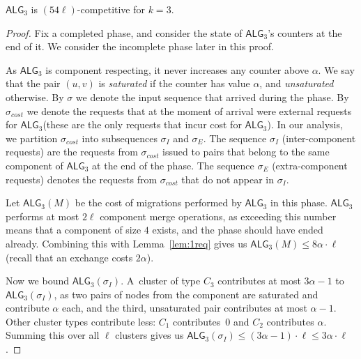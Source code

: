 \documentclass[a4paper,anonymous,USenglish]{lipics-v2019}
\newcommand{\TAlg}{{\ensuremath{\textsf{ALG}_{3}}}\xspace}
\begin{document}
\begin{theorem}
	\TAlg is $(54\ell)$-competitive for $k=3$.
\end{theorem}
\begin{proof}
	Fix a completed phase, and consider the state of \TAlg's counters at the end of it.
	We consider the incomplete phase later in this proof.
	
	As \TAlg is component respecting, it never increases any counter above $\alpha$.
	We say that the pair $(u, v)$ is \emph{saturated} if the counter has value $\alpha$, and \emph{unsaturated} otherwise.
	By $\sigma$ we denote the input sequence that arrived during the phase.
	By $\sigma_{cost}$ we denote the requests that at the moment of arrival were external requests for \TAlg (these are the only requests that incur cost for \TAlg).
	In our analysis, we partition $\sigma_{cost}$ into subsequences $\sigma_I$ and $\sigma_E$.
	The sequence $\sigma_I$ (inter-component requests) are the requests from $\sigma_{cost}$ issued to pairs that belong to the same component of \TAlg at the end of the phase.
	The sequence $\sigma_E$ (extra-component requests) denotes the requests from $\sigma_{cost}$ that do not appear in $\sigma_I$.
	
	
	Let $\TAlg(M)$ be the cost of migrations performed by \TAlg in this phase.
	\TAlg performs at most $2 \ell$ component merge operations, as
	exceeding this number means that a component of size $4$ exists, and the phase should have ended already.
	Combining this with Lemma~\ref{lem:1req} gives us $\TAlg(M) \leq 8\alpha\cdot\ell$ (recall that an exchange costs $2\alpha$).
	
	Now we bound $\TAlg(\sigma_I)$.
	A~cluster of type $C_3$ contributes at most $3 \alpha - 1$ to $\TAlg(\sigma_I)$, as two pairs of nodes from the component are saturated and contribute $\alpha$ each, and the third, unsaturated pair contributes at most $\alpha-1$.
	Other cluster types contribute less: $C_1$ contributes~$0$ and $C_2$ contributes $\alpha$.
	Summing this over all $\ell$ clusters gives us $\TAlg(\sigma_I) \leq (3 \alpha-1)\cdot \ell \leq 3\alpha\cdot\ell$.
	

\end{proof}
\end{document}

